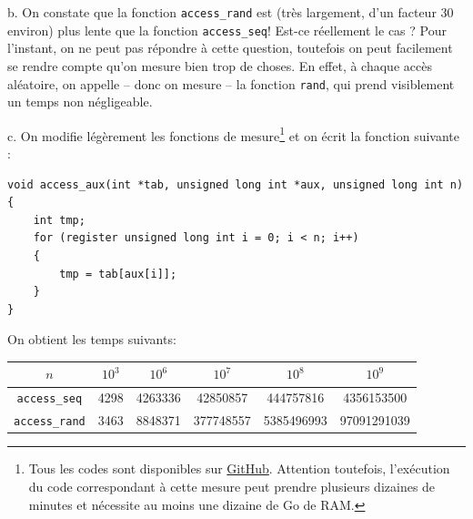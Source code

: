 \documentclass[11pt, a4 paper]{article}
\begin{document}
b. On constate que la fonction \texttt{access\_rand} est (très largement, d'un facteur 30 environ) plus lente que la fonction \texttt{access\_seq}!
Est-ce réellement le cas ? Pour l'instant, on ne peut pas répondre à cette question, toutefois on peut facilement se rendre compte qu'on mesure bien trop de choses.
En effet, à chaque accès aléatoire, on appelle -- donc on mesure -- la fonction \texttt{rand}, qui prend visiblement un temps non négligeable.


c. On modifie légèrement les fonctions de mesure\footnote{Tous les codes sont disponibles sur \href{https://github.com/VTrelat/ComputerArchitecture/tree/main/c}{GitHub}.
Attention toutefois, l'exécution du code correspondant à cette mesure peut prendre plusieurs dizaines de minutes et nécessite au moins une dizaine de Go de RAM.} et on écrit la fonction suivante :
\begin{lstlisting}[style=CStyle]
void access_aux(int *tab, unsigned long int *aux, unsigned long int n)
{
    int tmp;
    for (register unsigned long int i = 0; i < n; i++)
    {
        tmp = tab[aux[i]];
    }
}
\end{lstlisting}
On obtient les temps suivants:
\begin{center}
    \begin{tabular}{| c | c | c | c | c | c |}
        \hline
    $n$ & $10^3$ & $10^6$ & $10^7$ & $10^8$ & $10^9$ \\
        \hline
        \hline
        \texttt{access\_seq} & 4298 & 4263336 & 42850857 & 444757816 & 4356153500 \\
        \hline
        \texttt{access\_rand} & 3463 & 8848371 & 377748557 & 5385496993 & 97091291039 \\
        \hline
    \end{tabular}
\end{center}
\end{document}

